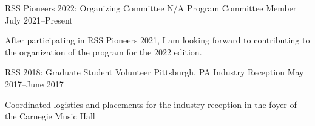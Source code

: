 
\begin{cventries}
  \cventry
  {RSS Pioneers 2022: Organizing Committee}
  {N/A}
  {Program Committee Member}
  {July 2021--Present}
  {
    \begin{cvitems}
    \item After participating in RSS Pioneers 2021, I am looking forward to
      contributing to the organization of the program for the 2022 edition.
    \end{cvitems}
  }%
  \cventry
  {RSS 2018: Graduate Student Volunteer}
  {Pittsburgh, PA}
  {Industry Reception}
  {May 2017--June 2017}
  {
    \begin{cvitems}
    \item Coordinated logistics and placements for the industry reception
      in the foyer of the Carnegie Music Hall
    \end{cvitems}
  }
\end{cventries}
